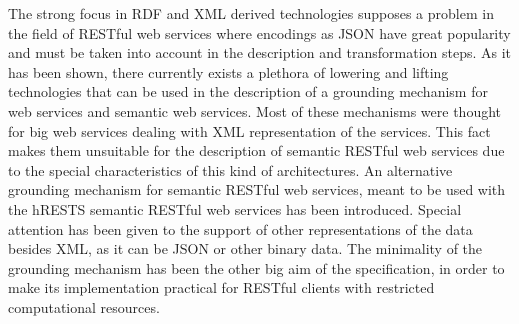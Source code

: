 The strong focus in RDF and XML derived technologies supposes a problem in the field of RESTful web services where encodings as JSON have great popularity and must be taken into account in the description and transformation steps. As it has been shown, there currently exists a plethora of lowering and lifting technologies that can be used in the description of a grounding mechanism for web services and semantic web services. Most of these mechanisms were thought for big web services dealing with XML representation of the services. This fact makes them unsuitable for the description of semantic RESTful web services due to the special characteristics of this kind of architectures. An alternative grounding mechanism for semantic RESTful web services, meant to be used with the hRESTS semantic RESTful web services has been introduced. Special attention has been given to the support of other representations of the data besides XML, as it can be JSON or other binary data. The minimality of the grounding mechanism has been the other big aim of the specification, in order to make its implementation practical for RESTful clients with restricted computational resources.\\